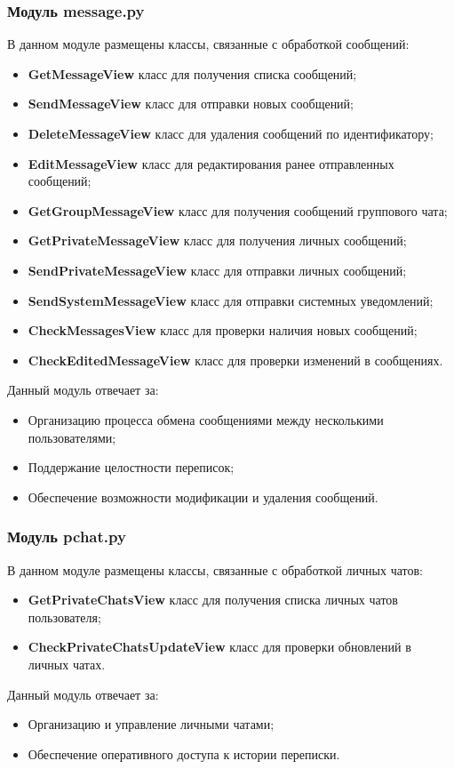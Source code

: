 \subsubsection{Модуль message.py}
В данном модуле размещены классы, связанные с обработкой сообщений:
\begin{itemize}
	\item \textbf{GetMessageView} класс для получения списка сообщений;
	\item \textbf{SendMessageView} класс для отправки новых сообщений;
	\item \textbf{DeleteMessageView} класс для удаления сообщений по идентификатору;
	\item \textbf{EditMessageView} класс для редактирования ранее отправленных сообщений;
	\item \textbf{GetGroupMessageView} класс для получения сообщений группового чата;
	\item \textbf{GetPrivateMessageView} класс для получения личных сообщений;
	\item \textbf{SendPrivateMessageView} класс для отправки личных сообщений;
	\item \textbf{SendSystemMessageView} класс для отправки системных уведомлений;
	\item \textbf{CheckMessagesView} класс для проверки наличия новых сообщений;
	\item \textbf{CheckEditedMessageView} класс для проверки изменений в сообщениях.
\end{itemize}
Данный модуль отвечает за:
\begin{itemize}
	\item Организацию процесса обмена сообщениями между несколькими пользователями;
	\item Поддержание целостности переписок;
	\item Обеспечение возможности модификации и удаления сообщений.
\end{itemize}

\subsubsection{Модуль pchat.py}
В данном модуле размещены классы, связанные с обработкой личных чатов:
\begin{itemize}
	\item \textbf{GetPrivateChatsView} класс для получения списка личных чатов пользователя;
	\item \textbf{CheckPrivateChatsUpdateView} класс для проверки обновлений в личных чатах.
\end{itemize}
Данный модуль отвечает за:
\begin{itemize}
	\item Организацию и управление личными чатами;
	\item Обеспечение оперативного доступа к истории переписки.
\end{itemize}

